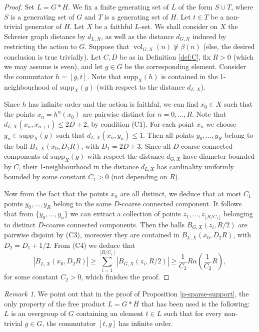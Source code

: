 \documentclass[11pt]{amsart}
\newcommand{\vol}{\ensuremath{\operatorname{vol}}}%
\newcommand{\supp}{\ensuremath{\textrm{supp}}}%
\theoremstyle{definition}
\theoremstyle{plain}
\theoremstyle{remark}
\newtheorem{remark}[defin]{Remark}
\begin{document}
\begin{proof}
Set $L=G\ast H$. We fix a finite generating set of $L$ of the form $S\cup T$, where $S$ is a generating set of $G$ and $T$ is a generating set of $H$. Let $t\in T$ be a non-trivial generator of $H$. Let $X$ be a faithful $L$-set. We shall consider on $X$ the Schreier graph distance by $d_{L, X}$, as well as the distance $d_{G, X}$ induced by restricting the action to $G$. Suppose that $\vol_{G, X}(n)\not \succcurlyeq \beta(n)$ (else, the desired conclusion is true trivially). Let $C, D$ be as in Definition \ref{def:C}, fix $R>0$ (which we may assume is even), and let $g\in G$ be the corresponding element. Consider the commutator $h=[g, t]$. Note that $\supp_X(h)$ is contained in the 1-neighbourhood of $\supp_X(g)$ (with respect to the distance $d_{L, X}$). 

Since $h$ has infinite order and the action is faithful,  we can find $x_0\in X$ such that the points $x_n=h^n(x_0)$ are pairwise distinct for $n=0,\ldots, R$. Note that $d_{L, X}(x_n, x_{n+1})\le 2D+2$, by condition (C1). For each point $x_n$ we  choose $y_n \in \supp_X(g)$ such that $d_{L, X}(x_n, y_n)\le 1$. Then all points $y_0,\ldots, y_R$ belong to the ball $B_{L, X}(x_0, D_1R)$, with $D_1=2D+3$. Since all $D$-coarse connected components of $\supp_X(g)$ with respect the distance $d_{G, X}$ have diameter bounded by $C$, their 1-neighbourhood in the distance $d_{L, X}$ has cardinality uniformly bounded by some constant $C_1>0$  (not depending on $R$).

Now from the fact that the points $x_n$ are all distinct, we deduce that at most  $C_1$ points  $y_0, \ldots, y_R$ belong to the same $D$-coarse connected component. It follows that from $\{y_0,\ldots, y_n\}$ we can extract a collection of points $z_{1}, \ldots, z_{\lfloor R/ C_1 \rfloor}$ belonging to distinct $D$-coarse connected components. Then the balls $B_{G, X}(z_i, R/2)$ are pairwise disjoint by (C3), moreover they are contained in $B_{L, X}(x_0, D_2R)$, with $D_2=D_1+1/2$. From (C4) we deduce that 
\[|B_{L, X}(x_0, D_2R)|\ge \sum_{i=1}^{\lfloor R/C_1\rfloor} |B_{G, X}(z_i, R/2)|\ge \frac{1}{C_2} R\alpha (\frac{1}{C_2} R),\]
 for some constant $C_2>0$, which finishes the proof.  \qedhere
\end{proof}

\begin{remark} \label{r-sparse-support}
We point out that in the proof of Proposition \ref{p-sparse-support}, the only property of the free product $L=G\ast H$ that has been used is the following: $L$ is an overgroup of $G$ containing an element $t\in L$ such that for every non-trivial $g\in G$, the commutator $[t, g]$ has infinite order.  
\end{remark}
\end{document}
